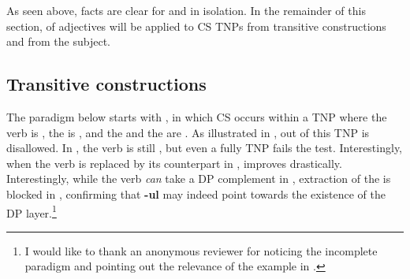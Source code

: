 \documentclass[output=paper,hidelinks,newtxmath,]{langscibook}
\begin{document}
\noindent As seen above, facts are clear for  and  in isolation. In the remainder of this section,  of adjectives will be applied to CS TNPs from transitive constructions and from the subject.

\subsection{Transitive constructions}\label{15:s5.2}

The paradigm below starts with , in which CS occurs within a TNP where the verb is , the  is , and the  and the  are . As illustrated in ,  out of this TNP is disallowed. In , the verb is still , but even a fully  TNP fails the  test. Interestingly, when the  verb is replaced by its  counterpart in ,  improves drastically. Interestingly, while the  verb \textit{can} take a DP complement in , extraction of the  is blocked in , confirming that \textbf{-ul} may indeed point towards the existence of the DP layer.\footnote{\label{15:fn9}I would like to thank an anonymous reviewer for noticing the incomplete paradigm and pointing out the relevance of the example in .}

\ea \label{15:ex16}
	\z
\z

\ea \label{15:ex17}
	\z
\z
\end{document}
